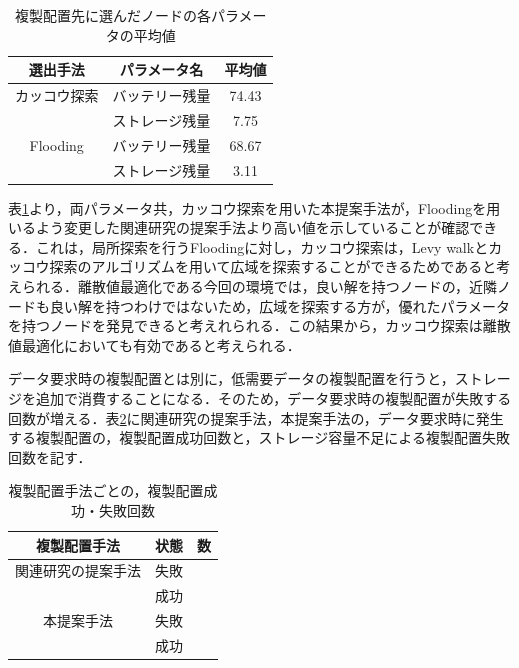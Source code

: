 \documentclass[11pt]{jreport}
\begin{document}
\begin{table}[H]
	\begin{center}
	\caption{複製配置先に選んだノードの各パラメータの平均値}
	\begin{tabular}{ | c | c | c | } \hline
	選出手法 & パラメータ名 & 平均値 \\ \hline \hline
	カッコウ探索 & バッテリー残量 & 74.43 \\ \cline{2-3}
		     & ストレージ残量 & 7.75 \\ \hline
	Flooding & バッテリー残量 & 68.67 \\ \cline{2-3}
		     & ストレージ残量 & 3.11 \\ \hline
	\end{tabular}
	\label{tab:node}
	\end{center}
\end{table}

\par 表\ref{tab:node}より，両パラメータ共，カッコウ探索を用いた本提案手法が，Floodingを用いるよう変更した関連研究の提案手法より高い値を示していることが確認できる．これは，局所探索を行うFloodingに対し，カッコウ探索は，Levy walkとカッコウ探索のアルゴリズムを用いて広域を探索することができるためであると考えられる．離散値最適化である今回の環境では，良い解を持つノードの，近隣ノードも良い解を持つわけではないため，広域を探索する方が，優れたパラメータを持つノードを発見できると考えれられる．この結果から，カッコウ探索は離散値最適化においても有効であると考えられる．
\par データ要求時の複製配置とは別に，低需要データの複製配置を行うと，ストレージを追加で消費することになる．そのため，データ要求時の複製配置が失敗する回数が増える．表\ref{tab:num}に関連研究の提案手法，本提案手法の，データ要求時に発生する複製配置の，複製配置成功回数と，ストレージ容量不足による複製配置失敗回数を記す．

\begin{table}[H]
	\begin{center}
	\caption{複製配置手法ごとの，複製配置成功・失敗回数}
	\begin{tabular}{ | c | c | c | } \hline
	複製配置手法 & 状態 & 数 \\ \hline \hline
	関連研究の提案手法 & 失敗 &  \\ \cline{2-3}
		     & 成功 &  \\ \hline
    本提案手法 & 失敗 &  \\ \cline{2-3}
		     & 成功 &  \\ \hline
	\end{tabular}
	\label{tab:num}
	\end{center}
\end{table}
\end{document}
